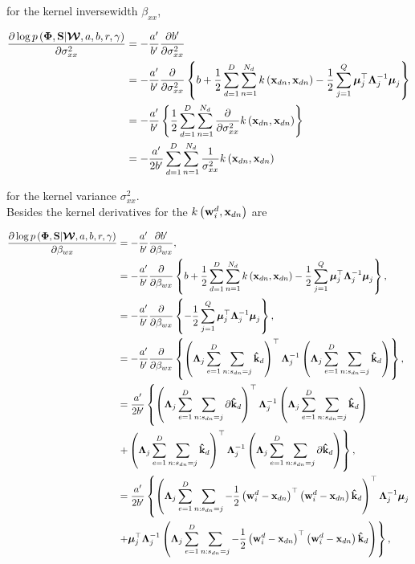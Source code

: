 	for the kernel inversewidth $ \beta_{xx}$,
	
	\begin{align}
	\frac{\partial \log p\left(\boldsymbol{\Phi},\mathbf{S}|\boldsymbol{\mathcal{W}},a,b,r,\gamma\right)}{\partial \sigma^2_{xx}} &= -\frac{a'}{b'}\frac{\partial b'}{\partial \sigma^2_{xx}} \\
	& =  -\frac{a'}{b'}\frac{\partial }{\partial \sigma^2_{xx}}\left\{b+{\frac{1}{2}}\sum\limits_{d=1}^{D}\sum\limits_{n=1}^{N_d}k\left(\mathbf{x}_{dn},\mathbf{x}_{dn}\right)-{\frac{1}{2}}\sum\limits_{j=1}^{Q}\boldsymbol{\mu}_j^\top \boldsymbol{\Lambda}_j^{-1}\boldsymbol{\mu}_j\right\} \\
	& = -\frac{a'}{b'}\left\{\frac{1}{2}\sum\limits_{d=1}^{D}\sum\limits_{n=1}^{N_d}\frac{\partial }{\partial \sigma^2_{xx}}k\left(\mathbf{x}_{dn},\mathbf{x}_{dn}\right)\right\} \\
	& = -\frac{a'}{2b'}\sum\limits_{d=1}^{D}{\sum\limits_{n=1}^{N_d} {\frac{1}{\sigma^2_{xx}}k\left(\mathbf{x}_{dn},\mathbf{x}_{dn}\right)}}
	\end{align}
	
	
	for the kernel variance $ \sigma^2_{xx}$.\\
	
	Besides the kernel derivatives for the $k\left(\mathbf{w}_{i}^d,\mathbf{x}_{dn}\right)$ are
	
	\begin{align}
	\frac{\partial \log p\left(\boldsymbol{\Phi},\mathbf{S}|\boldsymbol{\mathcal{W}},a,b,r,\gamma\right)}{\partial \beta_{wx}} &= -\frac{a'}{b'}\frac{\partial b'}{\partial \beta_{wx}}, \\
	& =  -\frac{a'}{b'}\frac{\partial }{\partial \beta_{wx}}\left\{b+{\frac{1}{2}}\sum\limits_{d=1}^{D}\sum\limits_{n=1}^{N_d}k\left(\mathbf{x}_{dn},\mathbf{x}_{dn}\right)-{\frac{1}{2}}\sum\limits_{j=1}^{Q}\boldsymbol{\mu}_j^\top \boldsymbol{\Lambda}_j^{-1}\boldsymbol{\mu}_j\right\}, \\
	& =  -\frac{a'}{b'}\frac{\partial }{\partial \beta_{wx}}\left\{-{\frac{1}{2}}\sum\limits_{j=1}^{Q}\boldsymbol{\mu}_j^\top \boldsymbol{\Lambda}_j^{-1}\boldsymbol{\mu}_j\right\}, \\
	& = -\frac{a'}{b'}\frac{\partial }{\partial \beta_{wx}} \left\{\left(\boldsymbol{\Lambda}_j\sum\limits_{e=1}^{D}{\sum\limits_{n:s_{dn}=j}\mathbf{\hat{k}}_d}\right)^\top\boldsymbol{\Lambda}_j^{-1}\left(\boldsymbol{\Lambda}_j\sum\limits_{e=1}^{D}{\sum\limits_{n:s_{dn}=j}\mathbf{\hat{k}}_d}\right) 
	\right\},\\
	& =  \frac{a'}{2b'} \left\{\left(\boldsymbol{\Lambda}_j\sum\limits_{e=1}^{D}{\sum\limits_{n:s_{dn}=j}\partial\mathbf{\hat{k}}_d}\right)^\top\boldsymbol{\Lambda}_j^{-1}\left(\boldsymbol{\Lambda}_j\sum\limits_{e=1}^{D}{\sum\limits_{n:s_{dn}=j}\mathbf{\hat{k}}_d}\right) \right. \\
	&\left. +   \left(\boldsymbol{\Lambda}_j\sum\limits_{e=1}^{D}{\sum\limits_{n:s_{dn}=j}\mathbf{\hat{k}}_d}\right)^\top\boldsymbol{\Lambda}_j^{-1}\left(\boldsymbol{\Lambda}_j\sum\limits_{e=1}^{D}{\sum\limits_{n:s_{dn}=j}\partial\mathbf{\hat{k}}_d}\right)
	\right\}, \\
	& =  \frac{a'}{2b'} \left\{\left(\boldsymbol{\Lambda}_j\sum\limits_{e=1}^{D}{\sum\limits_{n:s_{dn}=j}-\frac{1}{2}\left(\mathbf{w}_{i}^d-\mathbf{x}_{dn}\right)^\top\left(\mathbf{w}_{i}^d-\mathbf{x}_{dn}\right)\mathbf{\hat{k}}_d}\right)^\top\boldsymbol{\Lambda}_j^{-1}\boldsymbol{\mu}_j \right. \\
	&\left. +   \boldsymbol{\mu}_j^\top\boldsymbol{\Lambda}_j^{-1}\left(\boldsymbol{\Lambda}_j\sum\limits_{e=1}^{D}{\sum\limits_{n:s_{dn}=j}-\frac{1}{2}\left(\mathbf{w}_{i}^d-\mathbf{x}_{dn}\right)^\top\left(\mathbf{w}_{i}^d-\mathbf{x}_{dn}\right)\mathbf{\hat{k}}_d}\right)
	\right\},
	\end{align}
	
